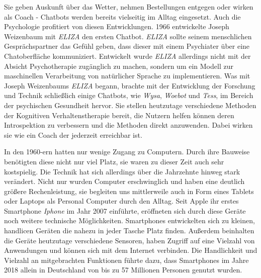 


Sie geben Auskunft über das Wetter, nehmen Bestellungen entgegen oder wirken als Coach - Chatbots werden bereits vielseitig im Alltag eingesetzt. Auch die Psychologie profitiert von diesen Entwicklungen. 1966 entwickelte Joseph Weizenbaum mit \emph{ELIZA} den ersten Chatbot. \emph{ELIZA} sollte seinem menschlichen Gesprächspartner das Gefühl geben, dass dieser mit einem Psychiater über eine Chatoberfläche kommuniziert. Entwickelt wurde \emph{ELIZA} allerdings nicht mit der Absicht  Psychotherapie zugänglich zu machen, sondern um ein Modell zur maschinellen Verarbeitung von natürlicher Sprache zu implementieren. Was mit Joseph Weizenbaums \emph{ELIZA} begann, brachte mit der Entwicklung der Forschung und Technik schließlich einige Chatbots, wie \emph{Wysa}, \emph{Woebot} und \emph{Tess}, im Bereich der psychischen Gesundheit hervor. Sie stellen heutzutage verschiedene Methoden der Kognitiven Verhaltenstherapie bereit, die Nutzern helfen können deren Introspektion zu verbessern und die Methoden direkt anzuwenden. Dabei wirken sie wie ein Coach der jederzeit erreichbar ist. 

In den 1960-ern hatten nur wenige Zugang zu Computern. Durch ihre Bauweise benötigten diese nicht nur viel Platz, sie waren zu dieser Zeit auch sehr kostspielig. Die Technik hat sich allerdings über die Jahrzehnte hinweg stark verändert. Nicht nur wurden Computer erschwinglich und haben eine deutlich größere Rechenleistung, sie begleiten uns mittlerweile auch in Form eines Tablets oder Laptops als Personal Computer durch den Alltag. Seit Apple ihr erstes Smartphone \emph{Iphone} im Jahr 2007 einführte, eröffneten sich durch diese Geräte noch weitere technische Möglichkeiten. Smartphones entwickelten sich zu kleinen, handlicen Geräten die nahezu in jeder Tasche Platz finden. Außerdem beinhalten die Geräte heutzutage verschiedene Sensoren, haben Zugriff auf eine Vielzahl von Anwendungen und können sich mit dem Internet verbinden. Die Handlichkeit und Vielzahl an mitgebrachten Funktionen führte dazu, dass Smartphones im Jahre 2018 allein in Deutschland von bis zu 57 Millionen Personen genutzt wurden. 

